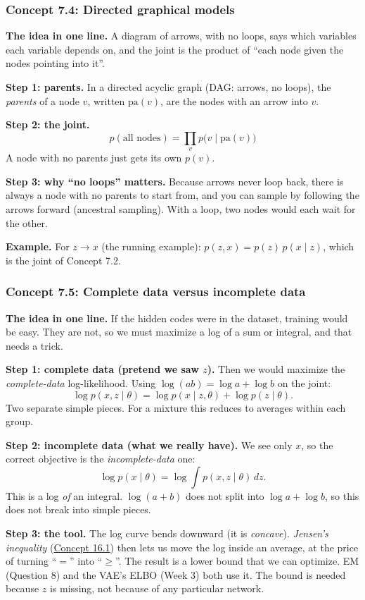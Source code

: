 \documentclass[12pt,a4paper]{article}
\begin{document}
\subsubsection{Concept 7.4: Directed graphical models}\label{c7-4}

\textbf{The idea in one line.} A diagram of arrows, with no loops, says which variables each variable depends on, and the joint is the product of ``each node given the nodes pointing into it''.

\textbf{Step 1: parents.} In a directed acyclic graph (DAG: arrows, no loops), the \emph{parents} of a node $v$, written $\text{pa}(v)$, are the nodes with an arrow into $v$.

\textbf{Step 2: the joint.}
\[
p(\text{all nodes})=\prod_{v}p\big(v\mid\text{pa}(v)\big)
\]
A node with no parents just gets its own $p(v)$.

\textbf{Step 3: why ``no loops'' matters.} Because arrows never loop back, there is always a node with no parents to start from, and you can sample by following the arrows forward (ancestral sampling). With a loop, two nodes would each wait for the other.

\textbf{Example.} For $z\to x$ (the running example): $p(z,x)=p(z)\,p(x\mid z)$, which is the joint of Concept 7.2.

\subsubsection{Concept 7.5: Complete data versus incomplete data}\label{c7-5}

\textbf{The idea in one line.} If the hidden codes were in the dataset, training would be easy. They are not, so we must maximize a log of a sum or integral, and that needs a trick.

\textbf{Step 1: complete data (pretend we saw $z$).} Then we would maximize the \emph{complete-data} log-likelihood. Using $\log(ab)=\log a+\log b$ on the joint:
\[
\log p(x,z\mid\theta)=\log p(x\mid z,\theta)+\log p(z\mid\theta).
\]
Two separate simple pieces. For a mixture this reduces to averages within each group.

\textbf{Step 2: incomplete data (what we really have).} We see only $x$, so the correct objective is the \emph{incomplete-data} one:
\[
\log p(x\mid\theta)=\log\int p(x,z\mid\theta)\,dz .
\]
This is a log \emph{of} an integral. $\log(a+b)$ does not split into $\log a+\log b$, so this does not break into simple pieces.

\textbf{Step 3: the tool.} The log curve bends downward (it is \emph{concave}). \emph{Jensen's inequality} (\hyperref[c16-1]{Concept 16.1}) then lets us move the log inside an average, at the price of turning ``$=$'' into ``$\ge$''. The result is a lower bound that we can optimize. EM (Question 8) and the VAE's ELBO (Week 3) both use it. The bound is needed because $z$ is missing, not because of any particular network.
\end{document}
